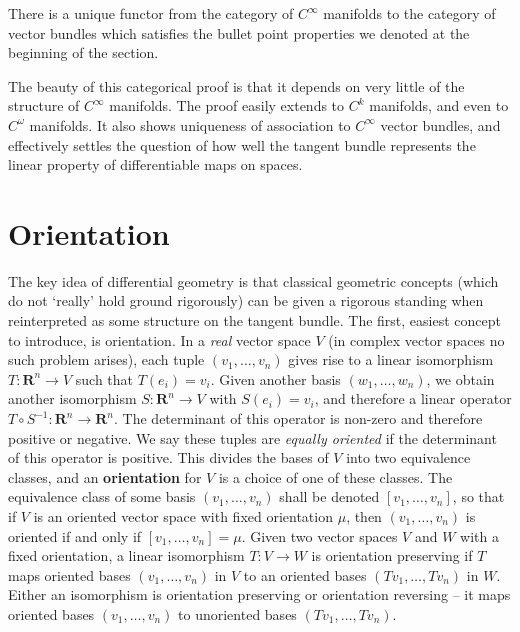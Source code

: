 \begin{theorem}
    There is a unique functor from the category of $C^\infty$ manifolds to the category of vector bundles which satisfies the bullet point properties we denoted at the beginning of the section.
\end{theorem}

The beauty of this categorical proof is that it depends on very little of the structure of $C^\infty$ manifolds. The proof easily extends to $C^k$ manifolds, and even to $C^\omega$ manifolds. It also shows uniqueness of association to $C^\infty$ vector bundles, and effectively settles the question of how well the tangent bundle represents the linear property of differentiable maps on spaces.

\section{Orientation}

The key idea of differential geometry is that classical geometric concepts (which do not `really' hold ground rigorously) can be given a rigorous standing when reinterpreted as some structure on the tangent bundle. The first, easiest concept to introduce, is orientation. In a {\it real} vector space $V$ (in complex vector spaces no such problem arises), each tuple $(v_1, \dots, v_n)$ gives rise to a linear isomorphism $T: \mathbf{R}^n \to V$ such that $T(e_i) = v_i$. Given another basis $(w_1, \dots, w_n)$, we obtain another isomorphism $S: \mathbf{R}^n \to V$ with $S(e_i) = v_i$, and therefore a linear operator $T \circ S^{-1}: \mathbf{R}^n \to \mathbf{R}^n$. The determinant of this operator is non-zero and therefore positive or negative. We say these tuples are {\it equally oriented} if the determinant of this operator is positive. This divides the bases of $V$ into two equivalence classes, and an {\bf orientation} for $V$ is a choice of one of these classes. The equivalence class of some basis $(v_1, \dots, v_n)$ shall be denoted $[v_1, \dots, v_n]$, so that if $V$ is an oriented vector space with fixed orientation $\mu$, then $(v_1, \dots, v_n)$ is oriented if and only if $[v_1, \dots, v_n] = \mu$. Given two vector spaces $V$ and $W$ with a fixed orientation, a linear isomorphism $T: V \to W$ is orientation preserving if $T$ maps oriented bases $(v_1, \dots, v_n)$ in $V$ to an oriented bases $(Tv_1, \dots, Tv_n)$ in $W$. Either an isomorphism is orientation preserving or orientation reversing -- it maps oriented bases $(v_1, \dots, v_n)$ to unoriented bases $(Tv_1, \dots, Tv_n)$.

